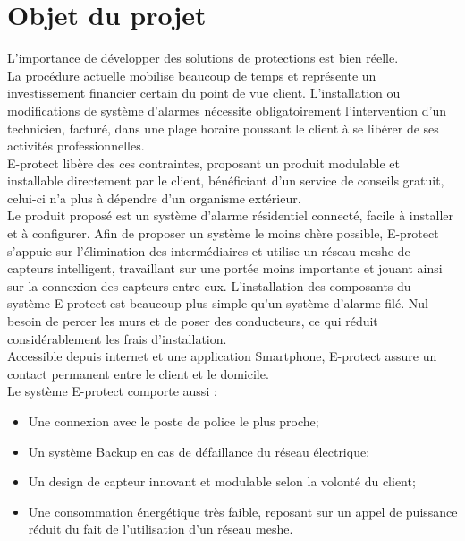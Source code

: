 \section{Objet du projet}

L'importance de développer des solutions de protections est bien réelle.\\
La procédure actuelle mobilise beaucoup de temps et représente un investissement financier certain du point de vue client. L’installation ou modifications de système d’alarmes nécessite obligatoirement l’intervention d’un technicien, facturé, dans une plage horaire poussant le client à se libérer de ses activités professionnelles.\\

E-protect libère des ces contraintes, proposant un produit modulable et installable directement par le client, bénéficiant d’un service de conseils gratuit, celui-ci n’a plus à dépendre d’un organisme extérieur.\\

Le produit proposé est un système d’alarme résidentiel connecté, facile à installer et à configurer. Afin de proposer un système le moins chère possible, E-protect s’appuie sur l’élimination des intermédiaires et utilise un réseau meshe de capteurs intelligent, travaillant sur une portée moins importante et jouant ainsi sur la connexion des capteurs entre eux. L'installation des composants du système E-protect est beaucoup plus simple qu'un système d'alarme filé. Nul besoin de percer les murs et de poser des conducteurs, ce qui réduit considérablement les frais d'installation.\\

Accessible depuis internet et une application Smartphone, E-protect assure un contact permanent entre le client et le domicile.\\

Le système E-protect comporte aussi :
\begin{itemize}
	\item Une connexion avec le poste de police le plus proche;
	\item Un système Backup en cas de défaillance du réseau électrique;
	\item Un design de capteur innovant et modulable selon la volonté du client;
	\item Une consommation énergétique très faible, reposant sur un appel de puissance réduit du fait de l’utilisation d’un réseau meshe.
\end{itemize}